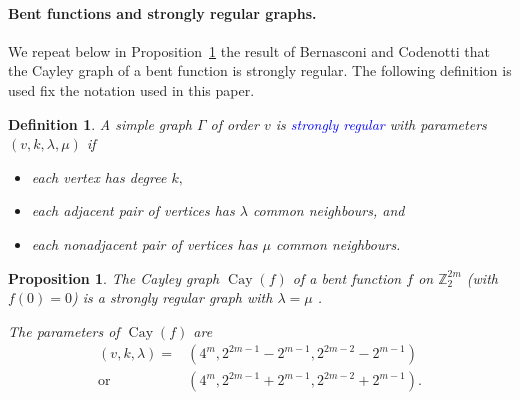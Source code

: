\documentclass[12pt,a4paper]{article}
\newcommand{\mb}[1]{\mathbb{#1}}
\newcommand{\Z}{\mb{Z}}
\newcommand{\Emph}[1]{\emph{\textcolor{blue}{#1}}}
\newcommand{\Cay}[1]{\operatorname{Cay}\left(#1\right)}
\newtheorem{Proposition}{Proposition}
\newtheorem{Definition}{Definition}
\begin{document}
\paragraph*{Bent functions and strongly regular graphs.}
We repeat below in Proposition~\ref{pr-Cayley-bent-strongly-regular}
the result of Bernasconi and Codenotti \cite{BerC99}
that the Cayley graph of a bent function is strongly regular.
The following definition is used fix the notation used in this paper.
\begin{Definition}
\label{def-strongly-regular-graph}
%
A simple graph $\Gamma$ of order $v$ is \Emph{strongly regular} \cite{Bos63,BroCN89,Sei79} with
parameters
$(v,k,\lambda,\mu)$ if
\begin{itemize}
 \item
each vertex has degree $k,$
 \item
each adjacent pair of vertices has $\lambda$ common neighbours, and
\item
each nonadjacent pair of vertices has $\mu$ common neighbours.
\end{itemize}
%
\end{Definition}
%



\begin{Proposition}
\label{pr-Cayley-bent-strongly-regular}
The Cayley graph $\Cay{f}$ of a bent function $f$ on $\Z_2^{2m}$
(with $f(0)=0$) is a strongly regular graph with $\lambda = \mu$ \cite[Lemma 12]{BerC99}.

The parameters of $\Cay{f}$ are \cite[Theorem 6.2.10]{Dil74} \cite[Theorem 3.2]{HuaY04}
\begin{align*}
(v,k,\lambda) = &(4^m, 2^{2 m - 1} - 2^{m-1}, 2^{2 m - 2} - 2^{m-1})
\\
  \text{or} \quad &(4^m, 2^{2 m - 1} + 2^{m-1}, 2^{2 m - 2} + 2^{m-1}).
\end{align*}
\end{Proposition}

%
\end{document}
